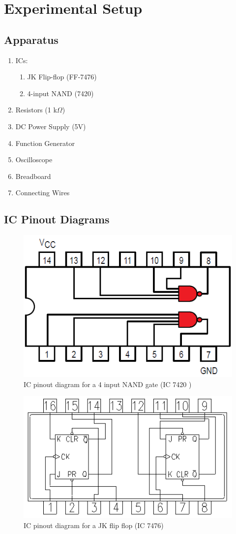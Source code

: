 \section{Experimental Setup}

\subsection*{Apparatus}

\begin{enumerate}
    \item ICs:
    \begin{enumerate}
        \item JK Flip-flop (FF-7476)
        \item 4-input NAND (7420)
    \end{enumerate}
    \item Resistors (1 k$\Omega$)
    \item DC Power Supply (5V)
    \item Function Generator
    \item Oscilloscope
    \item Breadboard
    \item Connecting Wires
\end{enumerate}

\subsection*{IC Pinout Diagrams}

\begin{figure}[H]
    \centering
    \includegraphics[width=0.6\columnwidth]{images/nand.png}
    \caption{IC pinout diagram for a 4 input NAND gate (IC 7420 )}
\end{figure}

\begin{figure}[H]
    \centering
    \includegraphics[width=0.75\columnwidth]{images/jk.png}
    \caption{IC pinout diagram for a JK flip flop (IC 7476)}
\end{figure}